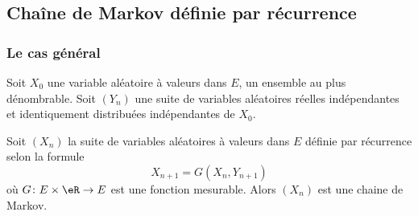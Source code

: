 \subsection{Chaîne de Markov définie par récurrence}

\subsubsection{Le cas général}

\begin{proposition}     \label{PropqiMdHh}
	Soit \( X_0\) une variable aléatoire à valeurs dans \( E\), un ensemble au plus dénombrable. Soit \( (Y_n)\) une suite de variables aléatoires réelles indépendantes et identiquement distribuées indépendantes de \( X_0\).

	Soit \( (X_n)\) la suite de variables aléatoires à valeurs dans \( E\) définie par récurrence selon la formule
	\begin{equation}
		X_{n+1}=G(X_n,Y_{n+1})
	\end{equation}
	où \( G\colon E\times \eR\to E\) est une fonction mesurable. Alors \( (X_n)\) est une chaine de Markov.
\end{proposition}

